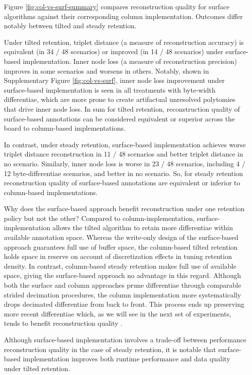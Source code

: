 Figure \ref{fig:col-vs-surf-summary} compares reconstruction quality for surface algorithms against their corresponding column implementation.
Outcomes differ notably between tilted and steady retention.

Under tilted retention, triplet distance (a measure of reconstruction accuracy) is equivalent (in 34 / 48 scenarios) or improved (in 14 / 48 scenarios) under surface-based implementation.
Inner node loss (a measure of reconstruction precision) improves in some scenarios and worsens in others.
Notably, shown in Supplementary Figure \ref{fig:col-vs-surf}, inner node loss improvement under surface-based implementation is seen in all treatments with byte-width differentiae, which are more prone to create artifactual unresolved polytomies that drive inner node loss.
In sum for tilted retention, reconstruction quality of surface-based annotations can be considered equivalent or superior across the board to column-based implementations.

In contrast, under steady retention, surface-based implementation achieves worse triplet distance reconstruction in 11 / 48 scenarios and better triplet distance in no scenario.
Similarly, inner node loss is worse in 23 / 48 scenarios, including 4 / 12 byte-differentiae scenarios, and better in no scenario.
So, for steady retention reconstruction quality of surface-based annotations are equivalent or inferior to column-based implementations.

Why does the surface-based approach benefit reconstruction under one retention policy but not the other?
Compared to column-implementation, surface-implementation allows the tilted algorithm to retain more differentiae within available annotation space.
Whereas the write-only design of the surface-based approach guarantees full use of buffer space, the column-based tilted retention holds space in reserve on account of discretization effects in tuning retention density.
In contrast, column-based steady retention makes full use of available space, giving the surface-based approach no advantage in this regard.
Although both the surface and column approaches prune differentiae through comparable strided decimation procedures, the column implementation more systematically drops decimated differentiae from back to front.
This process ends up preserving more recent differentiae which, as we will see in the next set of experiments, tends to benefit reconstruction quality .

Although surface-based implementation involves a trade-off between performance reconstruction quality in the case of steady retention, it is notable that surface-based implementation improves both runtime performance and data quality under tilted retention.

